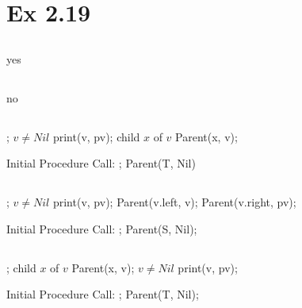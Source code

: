  
 \section{Ex 2.19}
 \subsection{}
 yes
 \subsection{}
 no
 \subsection{}
 
 \Prog\qq     %
; \p
\If $v \neq Nil$ \Then\p
print(v, pv);\p
\Endif\p
\Foreach child $x$ of $v$ \Do\p
Parent(x, v);\p
\Endfor\qq
\Fini 

 Initial Procedure Call:
  \Prog\qq     %
; \p
Parent(T, Nil)\qq
\Fini 
 
 \subsection{}
 \Prog\qq     %
; \p
\If $v \neq Nil$ \Then\p
print(v, pv);\p
\Endif\p
Parent(v.left, v);\p
Parent(v.right, pv);\qq
\Fini 

 Initial Procedure Call:
  \Prog\qq     %
; \p
Parent(S, Nil);\qq
\Fini 

\subsection{}
\Prog\qq     %
; \p
\Foreach child $x$ of $v$ \Do\p
Parent(x, v);\p
\Endfor\p
\If $v \neq Nil$ \Then\p
print(v, pv);\p
\Endif\qq
\Fini 

 Initial Procedure Call:
  \Prog\qq     %
; \p
Parent(T, Nil);\qq
\Fini 



